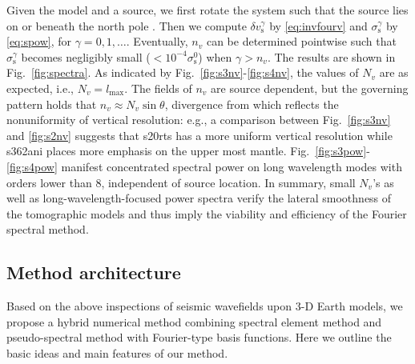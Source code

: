 \documentclass[extra,referee]{gji}
\begin{document}
Given the model and a source, we first rotate the system such that 
the source lies on or beneath the north pole \cite[]{nissen2007axisem}. 
Then we compute $\delta v_{\text{s}}^\gamma$ by \eqref{eq:invfourv} and 
$\sigma_{\text{s}}^\gamma$ by \eqref{eq:spow}, for $\gamma=0,1,\dots$. 
Eventually, $n_v$ can be determined pointwise such that 
$\sigma_{\text{s}}^\gamma$ becomes negligibly small 
($<10^{-4}\sigma_{\text{s}}^0$) when $\gamma>n_v$. 
The results are shown in Fig.~\ref{fig:spectra}. As indicated by 
Fig.~\ref{fig:s3nv}-\ref{fig:s4nv}, the values of $N_v$ are as expected, 
i.e., $N_v=l_\text{max}$. The fields of $n_v$ are source dependent, but the 
governing pattern holds that $n_v\approx N_v\sin{\theta}$, divergence
from which reflects the nonuniformity of vertical resolution: e.g., a 
comparison between Fig.~\ref{fig:s3nv} and \ref{fig:s2nv} suggests that
s20rts has a more uniform vertical resolution while s362ani places more 
emphasis on the upper most mantle. Fig.~\ref{fig:s3pow}-\ref{fig:s4pow}
manifest concentrated spectral power on long wavelength modes with 
orders lower than 8, independent of source location.
In summary, small $N_v$'s as well as long-wavelength-focused power spectra 
verify the lateral smoothness of the tomographic models and thus 
imply the viability and efficiency of the Fourier spectral method.  


\subsection{Method architecture}
\label{sec:idea}
Based on the above inspections of seismic wavefields upon 3-D Earth models, 
we propose a hybrid numerical method combining spectral element method and
pseudo-spectral method with Fourier-type basis functions. 
Here we outline the basic ideas and main features of our method.
\end{document}
